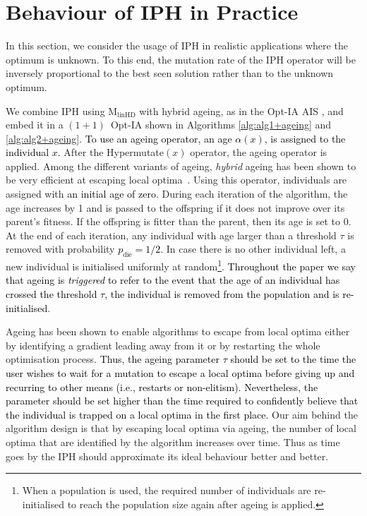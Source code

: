 \documentclass[lettersize,journal]{IEEEtran}
\newcommand{\new}[1]{\textcolor{black}{#1}}
\newcommand{\rev}[1]{\textcolor{black}{#1}}
\newcommand{\rerev}[1]{\textcolor{black}{#1}}
\newcommand{\linHD}{M$_{\text{linHD}}$}
\newcommand{\IPHfcm}{IPH}
\begin{document}
 	
 	\section{Behaviour of IPH in Practice}

In this section, we consider the usage of IPH in realistic applications where the optimum is unknown.
 To this end, the mutation rate of the IPH operator will be inversely proportional to the best seen solution rather than to the unknown optimum. 
 
 We combine \IPHfcm{} using {\linHD } with hybrid ageing, as in the Opt-IA AIS \cite{CutelloNicosiaPavoneTimmis2007}, and embed it in a $(1+1)$~Opt-IA shown in Algorithms \ref{alg:alg1+ageing} and \ref{alg:alg2+ageing}. \new{To use \rev{an} ageing operator, an age $\alpha(x)$, is assigned to the individual $x$.} After the Hypermutate$(x)$ operator, the ageing operator is applied.
 	Among the different variants of ageing, {\it hybrid} ageing has been shown to be very efficient at escaping local optima~\cite{OlivetoSudholt2014ageing,CorusOlivetoYazdani2019TCS,CorusOlivetoYazdaniFASTAIS2018,CorusOlivetoYazdaniPPSN2018Approx}. Using this operator,  individuals are assigned with \rerev{an initial age of zero}. During each iteration of the algorithm, the age  increases by 1 and is passed to the offspring if it does not improve over its parent's fitness. If the offspring is fitter than the parent, then its age is set to 0. At the end of each iteration, any individual with age larger than a threshold $\tau$ is removed with probability \rev{$p_{\text{die}}=1/2$}. In case there is no other individual left, a new individual is initialised uniformly at random\footnote{When a population is used, the required number of individuals are re-initialised to reach the population size again after ageing is applied.}. \rerev{Throughout the paper we say that ageing is {\it triggered} to refer to the event that the age of an individual has crossed the threshold $\tau$, the individual is removed from the population and is re-initialised}.
 
 Ageing has been shown to enable algorithms to escape from local optima either by identifying a gradient leading away from it or by restarting the whole optimisation process. 
 \rerev{Thus, the ageing parameter $\tau$ should be set to the time the user wishes to wait for a mutation to escape a local optima before giving up and recurring to other means (i.e., restarts or non-elitism). Nevertheless, the parameter should be set higher than the time required to confidently believe that the individual is trapped on a local optima in the first place.} 
 Our aim behind the algorithm design is that by escaping local optima via ageing, the number of local optima that are identified by the algorithm increases over time. Thus as time goes by the IPH should approximate its ideal behaviour better and better.
 
\end{document}
